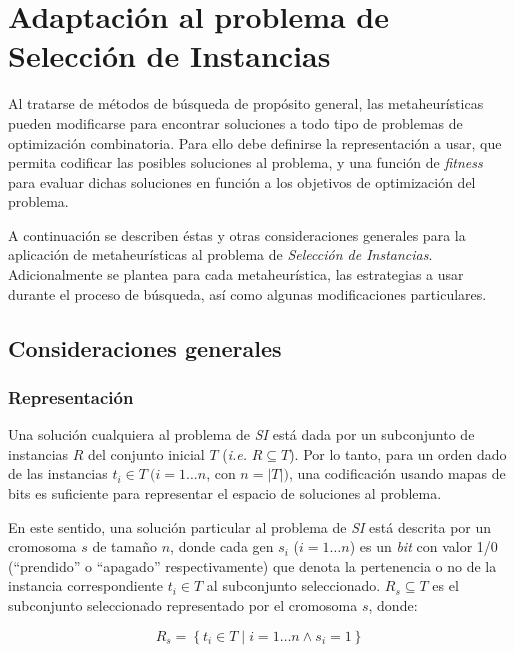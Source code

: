 \chapter{Adaptación al problema de Selección de Instancias}
\label{capitulo3}

Al tratarse de métodos de búsqueda de propósito general, las metaheurísticas pueden modificarse para encontrar soluciones a todo tipo de problemas de optimización combinatoria. Para ello debe definirse la representación a usar, que permita codificar las posibles soluciones al problema, y una función de \emph{fitness} para evaluar dichas soluciones en función a los objetivos de optimización del problema.

A continuación se describen éstas y otras consideraciones generales para la aplicación de metaheurísticas al problema de \emph{Selección de Instancias}. Adicionalmente se plantea para cada metaheurística, las estrategias a usar durante el proceso de búsqueda, así como algunas modificaciones particulares.

\section{Consideraciones generales}

\subsection{Representación}

Una solución cualquiera al problema de \emph{SI} está dada por un subconjunto de instancias $R$ del conjunto inicial $T$ (\emph{i.e.} $R \subseteq T$). Por lo tanto, para un orden dado de las instancias $t_i \in T\ (i = 1 \dots n$, con $n = \vert T \vert)$, una codificación usando mapas de bits es suficiente para representar el espacio de soluciones al problema.

En este sentido, una solución particular al problema de \emph{SI} está descrita por un cromosoma $s$ de tamaño $n$, donde cada gen $s_i$ ($i = 1 \dots n$) es un \emph{bit} con valor 1/0 (``prendido'' o ``apagado'' respectivamente) que denota la pertenencia o no de la instancia correspondiente $t_i \in T$ al subconjunto seleccionado. $R_s \subseteq T$ es el subconjunto seleccionado representado por el cromosoma $s$, donde:

\begin{equation}
R_s = \left\lbrace t_i \in T \mid i = 1 \dots n \land s_i = 1 \right\rbrace
\end{equation}

